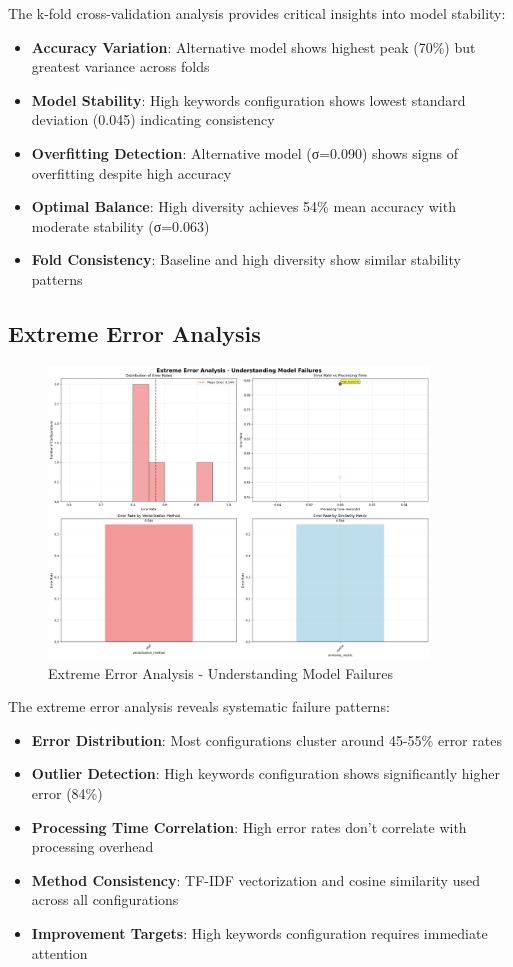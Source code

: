 \documentclass[12pt,a4paper]{article}
\begin{document}
The k-fold cross-validation analysis provides critical insights into model stability:
\begin{itemize}
    \item \textbf{Accuracy Variation}: Alternative model shows highest peak (70\%) but greatest variance across folds
    \item \textbf{Model Stability}: High keywords configuration shows lowest standard deviation (0.045) indicating consistency
    \item \textbf{Overfitting Detection}: Alternative model (σ=0.090) shows signs of overfitting despite high accuracy
    \item \textbf{Optimal Balance}: High diversity achieves 54\% mean accuracy with moderate stability (σ=0.063)
    \item \textbf{Fold Consistency}: Baseline and high diversity show similar stability patterns
\end{itemize}

\subsection{Extreme Error Analysis}
\begin{figure}[H]
    \centering
    \includegraphics[width=0.9\textwidth]{data/visualizations/extreme_error_analysis.png}
    \caption{Extreme Error Analysis - Understanding Model Failures}
    \label{fig:error_analysis}
\end{figure}

The extreme error analysis reveals systematic failure patterns:
\begin{itemize}
    \item \textbf{Error Distribution}: Most configurations cluster around 45-55\% error rates
    \item \textbf{Outlier Detection}: High keywords configuration shows significantly higher error (84\%)
    \item \textbf{Processing Time Correlation}: High error rates don't correlate with processing overhead
    \item \textbf{Method Consistency}: TF-IDF vectorization and cosine similarity used across all configurations
    \item \textbf{Improvement Targets}: High keywords configuration requires immediate attention
\end{itemize}
\end{document}
